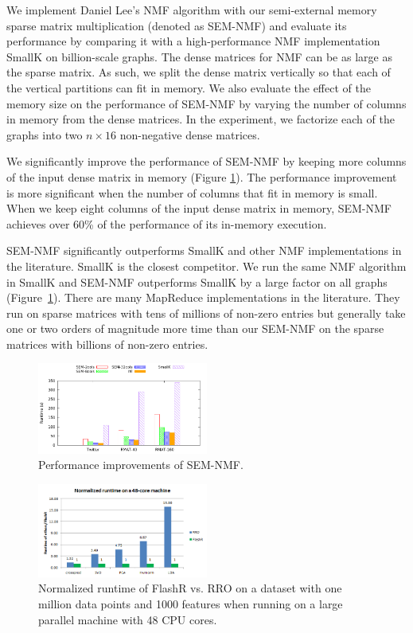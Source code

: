 \documentclass[simplex.tex]{subfiles}
\begin{document}
We implement Daniel Lee’s NMF algorithm with our semi-external memory
sparse matrix multiplication (denoted as SEM-NMF) and evaluate its
performance by comparing it with a high-performance NMF implementation
SmallK on billion-scale graphs. The dense matrices for NMF can be as
large as the sparse matrix. As such, we split the dense matrix
vertically so that each of the vertical partitions can fit in memory. We
also evaluate the effect of the memory size on the performance of
SEM-NMF by varying the number of columns in memory from the dense
matrices. In the experiment, we factorize each of the graphs
into two $n \times 16$ non-negative dense matrices.


We significantly improve the performance of SEM-NMF by keeping more
columns of the input dense matrix in memory (Figure \ref{fig:nmf}). The
performance improvement is more significant when the number of columns
that fit in memory is small. When we keep eight columns of the input
dense matrix in memory, SEM-NMF achieves over 60\% of the performance of
its in-memory execution.


SEM-NMF significantly outperforms SmallK and other NMF implementations
in the literature. SmallK is the closest competitor. We run the same NMF
algorithm in SmallK and SEM-NMF outperforms SmallK by a large factor on
all graphs (Figure~\ref{fig:nmf}). There are many MapReduce
implementations in the literature. They run on sparse matrices with tens
of millions of non-zero entries but generally take one or two orders of
magnitude more time than our SEM-NMF on the sparse matrices with
billions of non-zero entries.


\begin{figure}[h!]
\begin{cframed}
\centering
\includegraphics[width=0.5\textwidth]{../../figs/nmf.png}
\caption{
Performance improvements of SEM-NMF.
}
\label{fig:nmf}
\end{cframed}
\end{figure}

\begin{figure}[h!]
\begin{cframed}
\centering
\includegraphics[width=0.5\textwidth]{../../figs/FlashR.vs.RRO.png}
\caption{
Normalized runtime of FlashR vs. RRO on a dataset with one million data points
	and 1000 features when running on a large parallel machine with 48 CPU cores.
}
\label{fig:flashr}
\end{cframed}
\end{figure}
\end{document}
